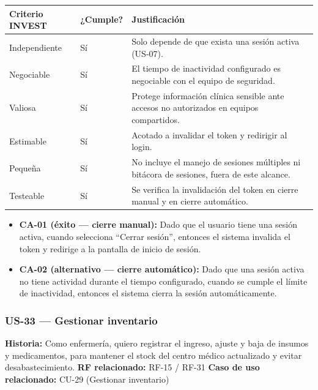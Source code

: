 \documentclass[11pt,a4paper]{article}
\providecommand{\tightlist}{%
	\setlength{\itemsep}{0pt}\setlength{\parskip}{0pt}}
\begin{document}
	\begin{longtable}{p{} p{} p{}}
		\toprule
		\textbf{Criterio INVEST} & \textbf{¿Cumple?} & \textbf{Justificación} \\
		\midrule
		\endhead
		Independiente & Sí & Solo depende de que exista una sesión activa (US-07). \\
		Negociable & Sí & El tiempo de inactividad configurado es negociable con el equipo de seguridad. \\
		Valiosa & Sí & Protege información clínica sensible ante accesos no autorizados en equipos compartidos. \\
		Estimable & Sí & Acotado a invalidar el token y redirigir al login. \\
		Pequeña & Sí & No incluye el manejo de sesiones múltiples ni bitácora de sesiones, fuera de este alcance. \\
		Testeable & Sí & Se verifica la invalidación del token en cierre manual y en cierre automático. \\
		\bottomrule
	\end{longtable}
	
	\begin{itemize}
		\tightlist
		\item \textbf{CA-01 (éxito --- cierre manual):} Dado que el usuario tiene una sesión activa, cuando selecciona ``Cerrar sesión'', entonces el sistema invalida el token y redirige a la pantalla de inicio de sesión.
		\item \textbf{CA-02 (alternativo --- cierre automático):} Dado que una sesión activa no tiene actividad durante el tiempo configurado, cuando se cumple el límite de inactividad, entonces el sistema cierra la sesión automáticamente.
	\end{itemize}
	
	\subsubsection{US-33 --- Gestionar inventario}
	
	\textbf{Historia:} Como enfermería, quiero registrar el ingreso, ajuste y baja de insumos y medicamentos, para mantener el stock del centro médico actualizado y evitar desabastecimiento.
	\textbf{RF relacionado:} RF-15 / RF-31
	\textbf{Caso de uso relacionado:} CU-29 (Gestionar inventario)
	
\end{document}
